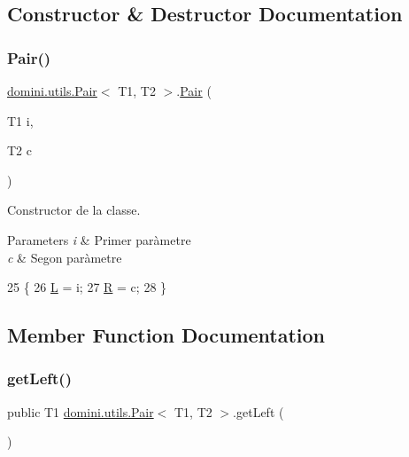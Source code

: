 \subsection{Constructor \& Destructor Documentation}
\mbox{\label{classdomini_1_1utils_1_1Pair_a9db8755d5034cf4f99f9007b9d6fd22d}} 
\subsubsection{\texorpdfstring{Pair()}{Pair()}}
{\footnotesize\ttfamily \hyperlink{classdomini_1_1utils_1_1Pair}{domini.\+utils.\+Pair}$<$ T1, T2 $>$.\hyperlink{classdomini_1_1utils_1_1Pair}{Pair} (\begin{DoxyParamCaption}\item[{T1}]{i,  }\item[{T2}]{c }\end{DoxyParamCaption})\hspace{0.3cm}{\ttfamily [inline]}}



Constructor de la classe. 


\begin{DoxyParams}{Parameters}
{\em i} & Primer paràmetre \\
\hline
{\em c} & Segon paràmetre \\
\hline
\end{DoxyParams}

\begin{DoxyCode}
25                             \{
26         \hyperlink{classdomini_1_1utils_1_1Pair_a276a0eee9fa97fc27b37fab887f07cea}{L} = i;
27         \hyperlink{classdomini_1_1utils_1_1Pair_aebf54d48000999b84e5e24a2c62088d4}{R} = c;
28     \}
\end{DoxyCode}


\subsection{Member Function Documentation}
\mbox{\label{classdomini_1_1utils_1_1Pair_a9439fbd8488cb1fbf00c57f15f093c4b}} 
\subsubsection{\texorpdfstring{get\+Left()}{getLeft()}}
{\footnotesize\ttfamily public T1 \hyperlink{classdomini_1_1utils_1_1Pair}{domini.\+utils.\+Pair}$<$ T1, T2 $>$.get\+Left (\begin{DoxyParamCaption}{ }\end{DoxyParamCaption})\hspace{0.3cm}{\ttfamily [inline]}}

